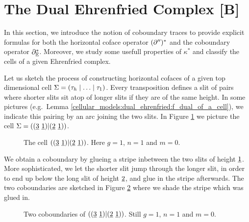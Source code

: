 \section{The Dual Ehrenfried Complex [B]}
\label{cellular_models:dual_ehrenfried}
In this section, we introduce the notion of coboundary traces to provide explicit formulas for both the horizontal coface operator $(\partial'')^\ast$ and
the coboundary operator $\partial_\mathbb E^\ast$.
Moreover, we study some usefull properties of $\kappa^\ast$ and classify the cells of a given Ehrenfried complex.

Let us sketch the process of constructing horizontal cofaces of a given top dimensional cell $\Sigma = \inhom$.
Every transposition defines a slit of pairs where shorter slits sit atop of longer slits if they are of the same height.
In some pictures (e.g.\ Lemma \ref{cellular_models:dual_ehrenfried:f_dual_of_a_cell}), we indicate this pairing by an arc joining the two slits.
In Figure \ref{cellular_models:dual_ehrenfried:motivate_coboundaries_pre} we picture the cell $\Sigma = ((\ul3\ \ul1)|(\ul2\ \ul1))$.
\begin{figure}[ht]
\centering
{}
\caption{\label{cellular_models:dual_ehrenfried:motivate_coboundaries_pre}The cell $((\ul3\ \ul1)|(\ul2\ \ul1))$. Here $g=1$, $n=1$ and $m=0$.}
\end{figure}

We obtain a coboundary by glueing a stripe inbetween the two slits of height $\underline{\smash{1}}$.
More sophisticated, we let the shorter slit jump through the longer slit, in order to end up below the long slit of height $\underline{\smash{2}}$, and glue in the stripe afterwards.
The two coboundaries are sketched in Figure \ref{cellular_models:dual_ehrenfried:motivate_coboundaries} where we shade the stripe which was glued in.
\begin{figure}[ht]
\centering
{}
\caption{\label{cellular_models:dual_ehrenfried:motivate_coboundaries}Two coboundaries of $((\ul3\ \ul1)|(\ul2\ \ul1))$. Still $g=1$, $n=1$ and $m=0$.}
\end{figure}

